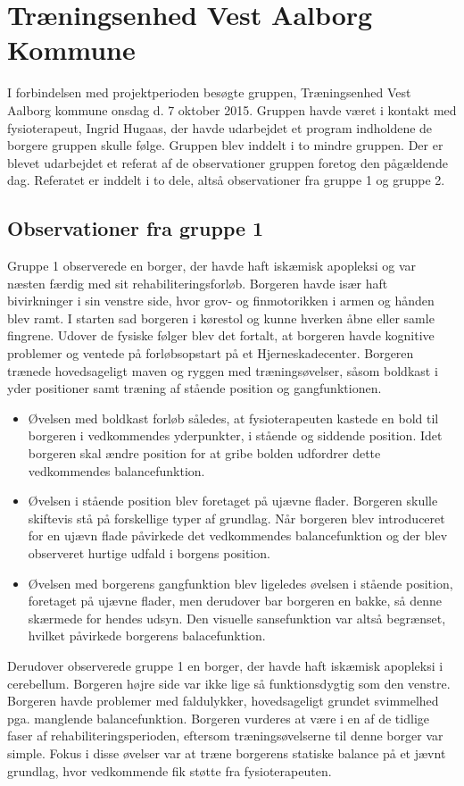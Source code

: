 \chapter{Træningsenhed Vest Aalborg Kommune}
I forbindelsen med projektperioden besøgte gruppen, Træningsenhed Vest Aalborg kommune onsdag d. 7 oktober 2015. Gruppen havde været i kontakt med fysioterapeut, Ingrid Hugaas, der havde udarbejdet et program indholdene de borgere gruppen skulle følge. Gruppen blev inddelt i to mindre gruppen. Der er blevet udarbejdet et referat af de observationer gruppen foretog den pågældende dag. Referatet er inddelt i to dele, altså observationer fra gruppe 1 og gruppe 2. 

\section{Observationer fra gruppe 1}
Gruppe 1 observerede en borger, der havde haft iskæmisk apopleksi og var næsten færdig med sit rehabiliteringsforløb. Borgeren havde især haft bivirkninger i sin venstre side, hvor grov- og finmotorikken i armen og hånden blev ramt. I starten sad borgeren i kørestol og kunne hverken åbne eller samle fingrene. Udover de fysiske følger blev det fortalt, at borgeren havde kognitive problemer og ventede på forløbsopstart på et Hjerneskadecenter. Borgeren trænede hovedsageligt maven og ryggen med træningsøvelser, såsom boldkast i yder positioner samt træning af  stående position og gangfunktionen. 
\begin{itemize}
\item Øvelsen med boldkast forløb således, at fysioterapeuten kastede en bold til borgeren i vedkommendes yderpunkter, i stående og siddende position. Idet borgeren skal ændre position for at gribe bolden udfordrer dette vedkommendes balancefunktion. 
\item Øvelsen i stående position blev foretaget på ujævne flader. Borgeren skulle skiftevis stå på forskellige typer af grundlag. Når borgeren blev introduceret for en ujævn flade påvirkede det vedkommendes balancefunktion og der blev observeret hurtige udfald i borgens position. 
\item Øvelsen med borgerens gangfunktion blev ligeledes øvelsen i stående position, foretaget på ujævne flader, men derudover bar borgeren en bakke, så denne skærmede for hendes udsyn. Den visuelle sansefunktion var altså begrænset, hvilket påvirkede borgerens balacefunktion. 
\end{itemize}

Derudover observerede gruppe 1 en borger, der havde haft iskæmisk apopleksi i cerebellum. Borgeren højre side var ikke lige så funktionsdygtig som den venstre. Borgeren havde problemer med faldulykker, hovedsageligt grundet svimmelhed pga. manglende balancefunktion. Borgeren vurderes at være i en af de tidlige faser af rehabiliteringsperioden, eftersom træningsøvelserne til denne borger var simple. Fokus i disse øvelser var at træne borgerens statiske balance på et jævnt grundlag, hvor vedkommende fik støtte fra fysioterapeuten. 

